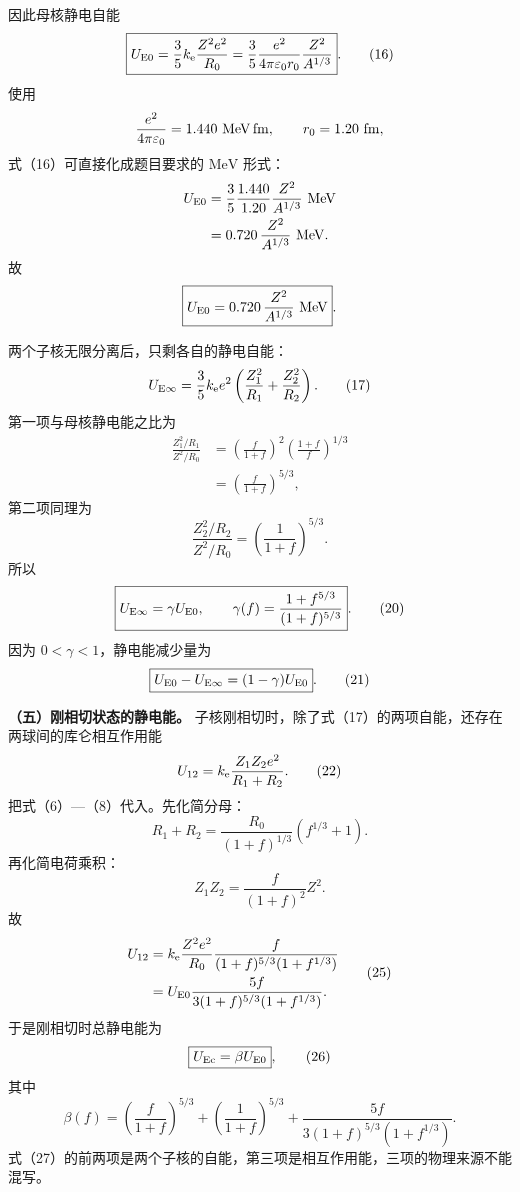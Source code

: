 \documentclass[12pt,a4paper,UTF8]{ctexart}
\begin{document}
因此母核静电自能 \[
\boxed{
U_{\rm E0}
=\frac35 k_{\rm e}\frac{Z^2e^2}{R_0}
=\frac35\frac{e^2}{4\pi\varepsilon_0r_0}
\frac{Z^2}{A^{1/3}}
}. \tag{16}
\] 使用 \[
\frac{e^2}{4\pi\varepsilon_0}
=1.440\ {\rm MeV\,fm},
\qquad
r_0=1.20\ {\rm fm},
\] 式（16）可直接化成题目要求的 \(\mathrm{MeV}\) 形式： \[
\begin{aligned}
U_{\rm E0}
&=\frac35\frac{1.440}{1.20}
\frac{Z^2}{A^{1/3}}\ {\rm MeV}\\
&=0.720\,\frac{Z^2}{A^{1/3}}\ {\rm MeV}.
\end{aligned}
\] 故 \[
\boxed{
U_{\rm E0}
=0.720\,\frac{Z^2}{A^{1/3}}\ {\rm MeV}
}.
\]

两个子核无限分离后，只剩各自的静电自能： \[
U_{\rm E\infty}
=\frac35k_{\rm e}e^2
\left(\frac{Z_1^2}{R_1}+\frac{Z_2^2}{R_2}\right). \tag{17}
\] 第一项与母核静电能之比为 \[
\begin{aligned}
\frac{Z_1^2/R_1}{Z^2/R_0}
&=\left(\frac{f}{1+f}\right)^2
\left(\frac{1+f}{f}\right)^{1/3}\\
&=\left(\frac{f}{1+f}\right)^{5/3},
\end{aligned} \tag{18}
\] 第二项同理为 \[
\frac{Z_2^2/R_2}{Z^2/R_0}
=\left(\frac1{1+f}\right)^{5/3}. \tag{19}
\] 所以 \[
\boxed{
U_{\rm E\infty}=\gamma U_{\rm E0},
\qquad
\gamma(f)=\frac{1+f^{5/3}}{(1+f)^{5/3}}
}. \tag{20}
\] 因为 \(0<\gamma<1\)，静电能减少量为 \[
\boxed{
U_{\rm E0}-U_{\rm E\infty}
=(1-\gamma)U_{\rm E0}
}. \tag{21}
\]

\textbf{（五）刚相切状态的静电能。}
子核刚相切时，除了式（17）的两项自能，还存在两球间的库仑相互作用能 \[
U_{12}=k_{\rm e}\frac{Z_1Z_2e^2}{R_1+R_2}. \tag{22}
\] 把式（6）---（8）代入。先化简分母： \[
R_1+R_2
=\frac{R_0}{(1+f)^{1/3}}\left(f^{1/3}+1\right). \tag{23}
\] 再化简电荷乘积： \[
Z_1Z_2=\frac{f}{(1+f)^2}Z^2. \tag{24}
\] 故 \[
\begin{aligned}
U_{12}
&=k_{\rm e}\frac{Z^2e^2}{R_0}
\frac{f}{(1+f)^{5/3}(1+f^{1/3})}\\
&=U_{\rm E0}
\frac{5f}{3(1+f)^{5/3}(1+f^{1/3})}.
\end{aligned} \tag{25}
\] 于是刚相切时总静电能为 \[
\boxed{
U_{\rm Ec}=\beta U_{\rm E0}
}, \tag{26}
\] 其中 \[
\boxed{
\beta(f)=
\left(\frac{f}{1+f}\right)^{5/3}
+\left(\frac1{1+f}\right)^{5/3}
+\frac{5f}{3(1+f)^{5/3}(1+f^{1/3})}
}. \tag{27}
\]
式（27）的前两项是两个子核的自能，第三项是相互作用能，三项的物理来源不能混写。
\end{document}
